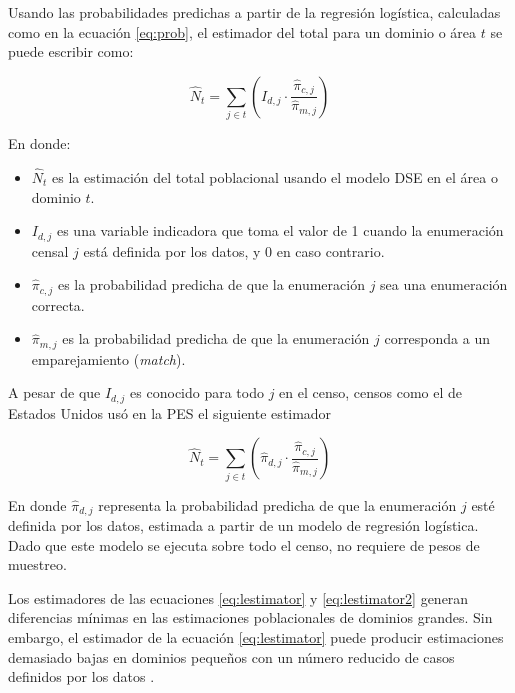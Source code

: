 \documentclass[
  12pt,
]{book}
\providecommand{\tightlist}{%
  \setlength{\itemsep}{0pt}\setlength{\parskip}{0pt}}
\begin{document}
Usando las probabilidades predichas a partir de la regresión logística, calculadas como en la ecuación \eqref{eq:prob}, el estimador del total para un dominio o área \(t\) se puede escribir como:

\begin{equation}
\hat{N}_{t} = \sum_{j \in t} \left( I_{d,j} \cdot \frac{\hat{\pi}_{c,j}}{\hat{\pi}_{m,j}} \right)  
\label{eq:lestimator}
\end{equation}

En donde:

\begin{itemize}
\tightlist
\item
  \(\hat{N}_{t}\) es la estimación del total poblacional usando el modelo DSE en el área o dominio \(t\).\\
\item
  \(I_{d,j}\) es una variable indicadora que toma el valor de 1 cuando la enumeración censal \(j\) está definida por los datos, y 0 en caso contrario.\\
\item
  \(\hat{\pi}_{c,j}\) es la probabilidad predicha de que la enumeración \(j\) sea una enumeración correcta.\\
\item
  \(\hat{\pi}_{m,j}\) es la probabilidad predicha de que la enumeración \(j\) corresponda a un emparejamiento (\emph{match}).
\end{itemize}

A pesar de que \(I_{d,j}\) es conocido para todo \(j\) en el censo, censos como el de Estados Unidos usó en la PES el siguiente estimador

\begin{equation}
\hat{N}_{t} = \sum_{j \in t} \left( \hat{\pi}_{d,j} \cdot \frac{\hat{\pi}_{c,j}}{\hat{\pi}_{m,j}} \right) 
\label{eq:lestimator2}
\end{equation}

En donde \(\hat{\pi}_{d,j}\) representa la probabilidad predicha de que la enumeración \(j\) esté definida por los datos, estimada a partir de un modelo de regresión logística. Dado que este modelo se ejecuta sobre todo el censo, no requiere de pesos de muestreo.

Los estimadores de las ecuaciones \eqref{eq:lestimator} y \eqref{eq:lestimator2} generan diferencias mínimas en las estimaciones poblacionales de dominios grandes. Sin embargo, el estimador de la ecuación \eqref{eq:lestimator} puede producir estimaciones demasiado bajas en dominios pequeños con un número reducido de casos definidos por los datos \citep{mulry2008direct}.
\end{document}
